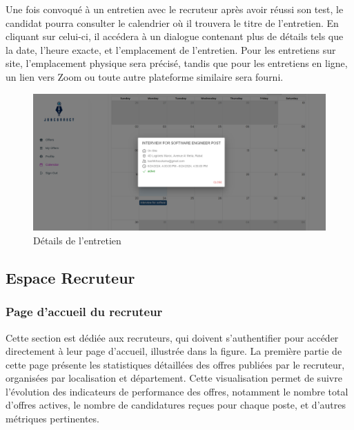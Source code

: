 Une fois convoqué à un entretien avec le recruteur après avoir réussi son test, le candidat pourra consulter le calendrier où il trouvera le titre de l'entretien. En cliquant sur celui-ci, il accédera à un dialogue contenant plus de détails tels que la date, l'heure exacte, et l'emplacement de l'entretien. Pour les entretiens sur site, l'emplacement physique sera précisé, tandis que pour les entretiens en ligne, un lien vers Zoom ou toute autre plateforme similaire sera fourni.
\begin{figure}[htbp]
   \centering
   \includegraphics[scale=0.2]{screens/detail interview.png} 
   \caption{Détails de l'entretien}
   \label{fig:listOffers}
\end{figure}

\subsection{Espace Recruteur}
\subsubsection{Page d'accueil du recruteur}
Cette section est dédiée aux recruteurs, qui doivent s'authentifier pour accéder 
directement à leur page d'accueil, illustrée dans la figure. La première 
partie de cette page présente les statistiques détaillées des offres publiées 
par le recruteur, organisées par localisation et département. 
Cette visualisation permet de suivre l'évolution des indicateurs de performance 
des offres, notamment le nombre total d'offres actives, le nombre de candidatures 
reçues pour chaque poste, et d'autres métriques pertinentes. 

